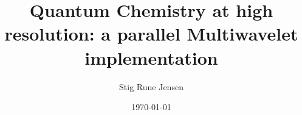 \documentclass [a4paper]{report}
\begin{document}
\title{Quantum Chemistry at high resolution: a parallel Multiwavelet implementation}

\author{Stig Rune Jensen}
\date{\today}

\pagebreak
\ \\
\pagebreak


\tableofcontents

\pagebreak
\ \\
\pagebreak
{}






%


\end{document}

